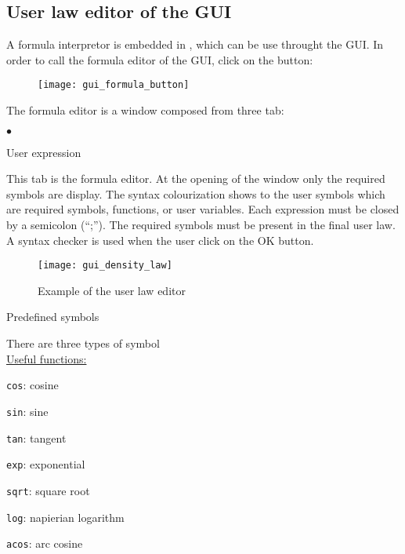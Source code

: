 {{{%
\subsection{User law editor of the GUI}

A formula interpretor is embedded in \CS, which can be use throught the GUI.
In order to call the formula editor of the GUI, click on the button:

\begin{figure}[!ht]
\begin{center}
\texttt{[image: gui\_formula\_button]}
\label{fig:mei_button}
\end{center}
\end{figure}

The formula editor is a window composed from three tab:
\begin{list}{$\bullet$}{}
\item User expression

This tab is the formula editor. At the opening of the
window only the required symbols are display.
The syntax colourization shows to the user symbols which are
required symbols, functions, or user variables.
Each expression must be closed by a semicolon (``;''). The
required symbols must be present in the final user law. A
syntax checker is used when the user click on the OK button.

\begin{figure}[!ht]
\begin{center}
\texttt{[image: gui\_density\_law]}
\caption{Example of the user law editor}
\label{fig:mei_editor}
\end{center}
\end{figure}

\item Predefined symbols

There are three types of symbol \\

\underline{Useful functions:}

\texttt{cos}: cosine

\texttt{sin}: sine

\texttt{tan}: tangent

\texttt{exp}: exponential

\texttt{sqrt}: square root

\texttt{log}: napierian logarithm

\texttt{acos}: arc cosine


\end{list}}}}
